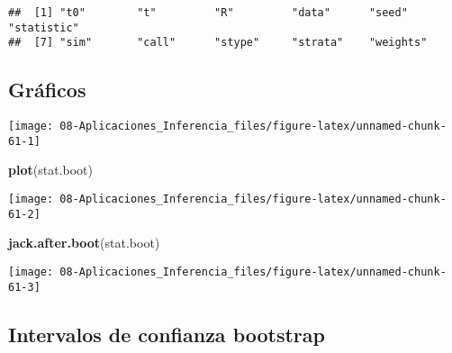 \documentclass[
]{book}
\newenvironment{Shaded}{\begin{snugshade}}{\end{snugshade}}
\newcommand{\DataTypeTok}[1]{\textcolor[rgb]{0.13,0.29,0.53}{#1}}
\newcommand{\KeywordTok}[1]{\textcolor[rgb]{0.13,0.29,0.53}{\textbf{#1}}}
\newcommand{\NormalTok}[1]{#1}
\newcommand{\OperatorTok}[1]{\textcolor[rgb]{0.81,0.36,0.00}{\textbf{#1}}}
\newcommand{\OtherTok}[1]{\textcolor[rgb]{0.56,0.35,0.01}{#1}}
\theoremstyle{break}
\theoremstyle{definition}
\theoremstyle{definition}
\theoremstyle{definition}
\theoremstyle{remark}
\begin{document}
\begin{verbatim}
##  [1] "t0"        "t"         "R"         "data"      "seed"      "statistic"
##  [7] "sim"       "call"      "stype"     "strata"    "weights"
\end{verbatim}

\hypertarget{gruxe1ficos}{%
\subsection{Gráficos}\label{gruxe1ficos}}

\begin{Shaded}
\end{Shaded}

\begin{center}\texttt{[image: 08-Aplicaciones\_Inferencia\_files/figure-latex/unnamed-chunk-61-1]} \end{center}

\begin{Shaded}
\begin{Highlighting}[]
\KeywordTok{plot}\NormalTok{(stat.boot)}
\end{Highlighting}
\end{Shaded}

\begin{center}\texttt{[image: 08-Aplicaciones\_Inferencia\_files/figure-latex/unnamed-chunk-61-2]} \end{center}

\begin{Shaded}
\begin{Highlighting}[]
\KeywordTok{jack.after.boot}\NormalTok{(stat.boot)}
\end{Highlighting}
\end{Shaded}

\begin{center}\texttt{[image: 08-Aplicaciones\_Inferencia\_files/figure-latex/unnamed-chunk-61-3]} \end{center}

\hypertarget{intervalos-de-confianza-bootstrap}{%
\subsection{Intervalos de confianza bootstrap}\label{intervalos-de-confianza-bootstrap}}
\end{document}
